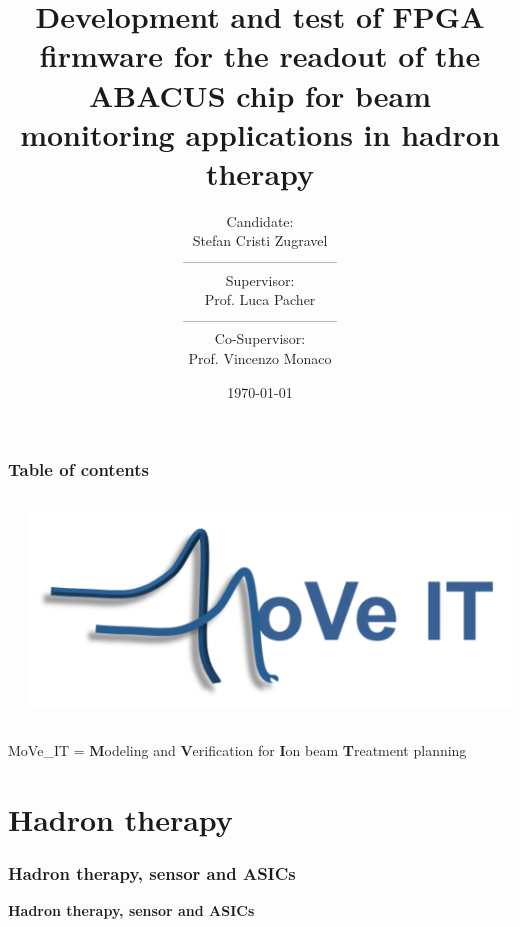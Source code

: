 \documentclass[aspectratio=169]{beamer}
\title{Development and test of FPGA firmware for the readout of the ABACUS chip for beam monitoring applications in hadron therapy}
\author[Stefan Zugravel]{Candidate: \\ Stefan Cristi Zugravel \\ --------------------------------- \\ Supervisor: \\ Prof. Luca Pacher\\ ---------------------------------  \\ Co-Supervisor: \\ Prof. Vincenzo Monaco}
\date{\today}
\institute[UniTo]{University of Turin}
\begin{document}
	
	\begin{frame}		
		\maketitle
	\end{frame}

	\begin{frame}
	\frametitle{Table of contents}
		\begin{columns}
				\begin{center}
					\tableofcontents
				\end{center}
				\begin{center}
					\includegraphics[width=0.95 \textwidth]{IMG/Move_IT_logo.PNG}
				\end{center}
		\end{columns}
	\vspace{1 cm}
	MoVe\_IT = \textbf{M}odeling and \textbf{V}erification for \textbf{I}on beam \textbf{T}reatment planning	
	\end{frame}

	\section{Hadron therapy}
	
	\begin{frame}
	\frametitle{Hadron therapy, sensor and ASICs}
	\begin{center}
		{\Huge {}\selectfont \color{blue} \textbf{Hadron therapy, sensor and ASICs}}
	\end{center}
\end{frame}
	
\end{document}
